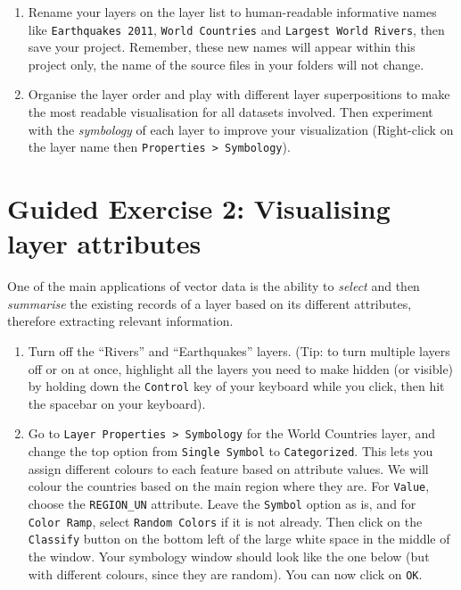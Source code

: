 \documentclass[
  letterpaper,
  DIV=11,
  numbers=noendperiod]{scrreprt}
\begin{document}
\begin{enumerate}
\def\labelenumi{(\arabic{enumi})}
\setcounter{enumi}{72}
\item
  Rename your layers on the layer list to human-readable informative
  names like \texttt{Earthquakes\ 2011}, \texttt{World\ Countries} and
  \texttt{Largest\ World\ Rivers}, then save your project. Remember,
  these new names will appear within this project only, the name of the
  source files in your folders will not change.
\item
  Organise the layer order and play with different layer superpositions
  to make the most readable visualisation for all datasets involved.
  Then experiment with the \emph{symbology} of each layer to improve
  your visualization (Right-click on the layer name then
  \texttt{Properties\ \textgreater{}\ Symbology}).
\end{enumerate}

\section{Guided Exercise 2: Visualising layer
attributes}\label{guided-exercise-2-visualising-layer-attributes}

One of the main applications of vector data is the ability to
\emph{select} and then \emph{summarise} the existing records of a layer
based on its different attributes, therefore extracting relevant
information.

\begin{enumerate}
\def\labelenumi{(\arabic{enumi})}
\setcounter{enumi}{74}
\item
  Turn off the ``Rivers'' and ``Earthquakes'' layers. (Tip: to turn
  multiple layers off or on at once, highlight all the layers you need
  to make hidden (or visible) by holding down the \texttt{Control} key
  of your keyboard while you click, then hit the spacebar on your
  keyboard).
\item
  Go to \texttt{Layer\ Properties\ \textgreater{}\ Symbology} for the
  World Countries layer, and change the top option from
  \texttt{Single\ Symbol} to \texttt{Categorized}. This lets you assign
  different colours to each feature based on attribute values. We will
  colour the countries based on the main region where they are. For
  \texttt{Value}, choose the \texttt{REGION\_UN} attribute. Leave the
  \texttt{Symbol} option as is, and for \texttt{Color\ Ramp}, select
  \texttt{Random\ Colors} if it is not already. Then click on the
  \texttt{Classify} button on the bottom left of the large white space
  in the middle of the window. Your symbology window should look like
  the one below (but with different colours, since they are random). You
  can now click on \texttt{OK}.
\end{enumerate}
\end{document}

